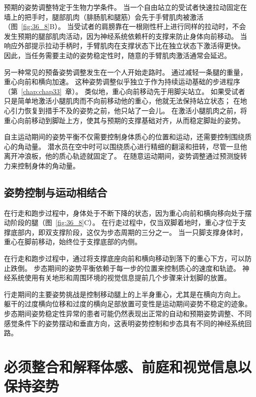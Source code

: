 预期的姿势调整特定于生物力学条件。
当一个自由站立的受试者快速拉动固定在墙上的把手时，腿部肌肉（腓肠肌和腿筋）会先于手臂肌肉被激活（图~\ref{fig:36_8}B）。
当受试者的肩膀靠在一根刚性杆上进行同样的拉动时，不会发生预期的腿部肌肉活动，因为神经系统依赖杆的支撑来防止身体向前移动。
当响应外部提示拉动手柄时，手臂肌肉在支撑状态下比在独立状态下激活得更快。
因此，当任务需要主动的姿势稳定性时，随意的手臂肌肉激活通常会延迟。


另一种常见的预备姿势调整发生在一个人开始走路时。
通过减轻一条腿的重量，重心向前和横向加速。
这种姿势调整似乎独立于作为持续运动基础的步进程序（第~\ref{chap:chap33}~章）。
类似地，重心向前移动先于用脚尖站立。
如果受试者只是简单地激活小腿肌肉而不向前移动他的重心，他就无法保持站立状态；
在地心引力恢复到措手不及的姿势之前，他只站了一会儿。
在激活小腿肌肉之前，将重心向前移动到脚趾上方，使其与预期的支撑基础对齐，从而稳定脚趾的姿势。


自主运动期间的姿势平衡不仅需要控制身体质心的位置和运动，还需要控制围绕质心的角动量。
潜水员在空中时可以围绕质心进行精细的翻滚和扭转，尽管一旦他离开冲浪板，他的质心轨迹就固定了。
在随意运动期间，姿势调整通过预测旋转力来控制身体的角动量。



\subsection{姿势控制与运动相结合}

在行走和跑步过程中，身体处于不断下降的状态，因为重心向前和横向移向处于摆动阶段的腿（图~\ref{fig:36_8}C）。
在行走过程中，仅当双脚着地时，重心才位于支撑底部内，即双支撑阶段，这仅为步态周期的三分之一。
当一只脚支撑身体时，重心在脚前移动，始终位于支撑底部的内侧。


在行走和跑步过程中，通过将支撑底座向前和横向移动到落下的重心下方，可以防止跌倒。
步态期间的姿势平衡依赖于每一步的位置来控制质心的速度和轨迹。
神经系统使用有关地形和周围环境的视觉信息提前几个步骤来计划脚的放置。


行走期间的主要姿势挑战是控制移动腿上的上半身重心，尤其是在横向方向上。
躯干的过度横向位移和过度的横向足部放置可变性是运动期间姿势不稳定的迹象。
步态期间姿势稳定性异常的患者可能仍然表现出正常的自动和预期姿势调整、不同感觉条件下的姿势摆动和垂直方向，这表明姿势控制和步态具有不同的神经系统回路。



\section{必须整合和解释体感、前庭和视觉信息以保持姿势}

